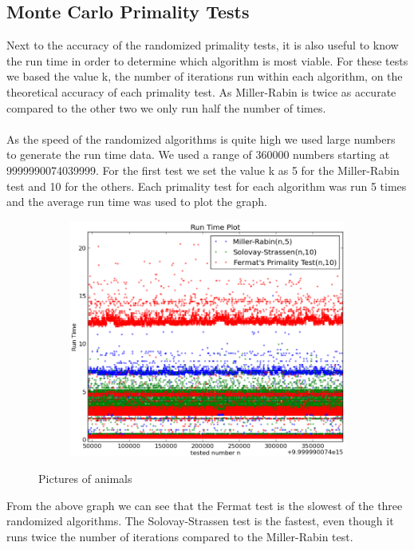\documentclass[compressed,final,notitlepage,narroweqnarray,inline,twoside,]{ieee}
\begin{document}
\subsection{Monte Carlo Primality Tests}
Next to the accuracy of the randomized primality tests, it is also useful to know the run time in order to determine which algorithm is most viable. For these tests we based the value k, the number of iterations run within each algorithm, on the theoretical accuracy of each primality test. As Miller-Rabin is twice as accurate compared to the other two we only run half the number of times.\\\\ As the speed of the randomized algorithms is quite high we used large numbers to generate the run time data. We used a range of 360000 numbers starting at 9999990074039999. For the first test we set the value k as 5 for the Miller-Rabin test and 10 for the others. Each primality test for each algorithm was run 5 times and the average run time was used to plot the graph.
\begin{figure}[H]
        \centering
        \begin{subfigure}[b]{0.5\textwidth}
                \includegraphics[width=\textwidth]{../images/all_singlethread_small_runtime}
                \label{fig:gull}
        \end{subfigure}
        \caption{Pictures of animals}\label{fig:animals}
\end{figure}
From the above graph we can see that the Fermat test is the slowest of the three randomized algorithms. The Solovay-Strassen test is the fastest, even though it runs twice the number of iterations compared to the Miller-Rabin test. 
\end{document}

